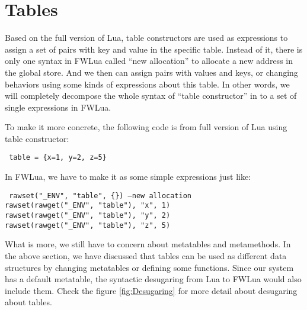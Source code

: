 \section{Tables}
Based on the full version of Lua, table constructors are used as expressions to assign a set of pairs with key and value in the specific table. Instead of it, there is only one syntax in FWLua called ``new allocation'' to allocate a new address in the global store. And we then can assign pairs with values and keys, or changing behaviors using some kinds of expressions about this table. In other words, we will completely decompose the whole syntax of ``table constructor'' in to a set of single expressions in FWLua. 

To make it more concrete, the following code is from full version of Lua using table constructor:
\begin{flushleft}
{\tt
table = \{x=1, y=2, z=5\}\\
}
\end{flushleft}
In FWLua, we have to make it as some simple expressions just like:
\begin{flushleft}
{\tt
rawset("\_ENV", "table", \{\}) --new allocation\\
rawset(rawget("\_ENV", "table"), "x", 1)\\
rawset(rawget("\_ENV", "table"), "y", 2)\\
rawset(rawget("\_ENV", "table"), "z", 5)\\
}
\end{flushleft}

What is more, we still have to concern about metatables and metamethods. In the above section, we have discussed that tables can be used as different data structures by changing metatables or defining some functions. Since our system has a default metatable, the syntactic desugaring from Lua to FWLua would also include them. Check the figure \ref{fig:Desugaring} for more detail about desugaring about tables.

